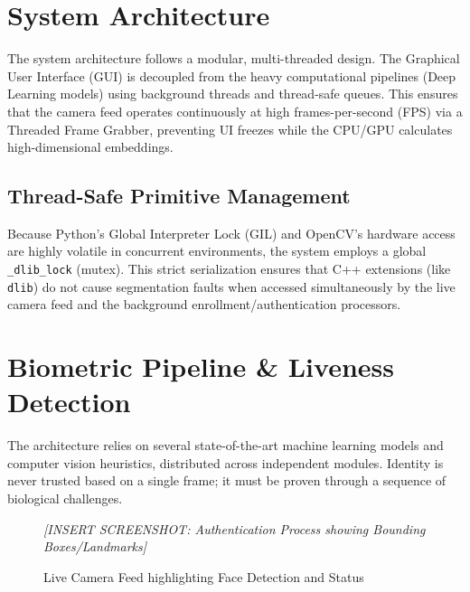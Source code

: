 \documentclass[12pt,a4paper]{article}
\begin{document}
\section{System Architecture}
The system architecture follows a modular, multi-threaded design. The Graphical User Interface (GUI) is decoupled from the heavy computational pipelines (Deep Learning models) using background threads and thread-safe queues. This ensures that the camera feed operates continuously at high frames-per-second (FPS) via a Threaded Frame Grabber, preventing UI freezes while the CPU/GPU calculates high-dimensional embeddings.

\subsection{Thread-Safe Primitive Management}
Because Python's Global Interpreter Lock (GIL) and OpenCV's hardware access are highly volatile in concurrent environments, the system employs a global \texttt{\_dlib\_lock} (mutex). This strict serialization ensures that C++ extensions (like \texttt{dlib}) do not cause segmentation faults when accessed simultaneously by the live camera feed and the background enrollment/authentication processors.

\section{Biometric Pipeline \& Liveness Detection}
The architecture relies on several state-of-the-art machine learning models and computer vision heuristics, distributed across independent modules. Identity is never trusted based on a single frame; it must be proven through a sequence of biological challenges.

\begin{figure}[H]
    \centering
    \colorbox{placeholderbg}{\parbox{0.8\textwidth}{\centering \vspace{3cm} \textit{[INSERT SCREENSHOT: Authentication Process showing Bounding Boxes/Landmarks]} \vspace{3cm}}}
    \caption{Live Camera Feed highlighting Face Detection and Status}
    \label{fig:auth_feed}
\end{figure}
\end{document}
